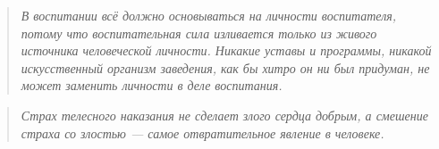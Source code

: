 \begin{quote}
    \textit{В воспитании всё должно основываться на личности воспитателя, потому что воспитательная сила изливается только из живого источника человеческой личности. Никакие уставы и программы, никакой искусственный организм заведения, как бы хитро он ни был придуман, не может заменить личности в деле воспитания.
    }
\end{quote}

\begin{quote}
    \textit{Страх телесного наказания не сделает злого сердца добрым, а смешение страха со злостью — самое отвратительное явление в человеке.}
\end{quote}

